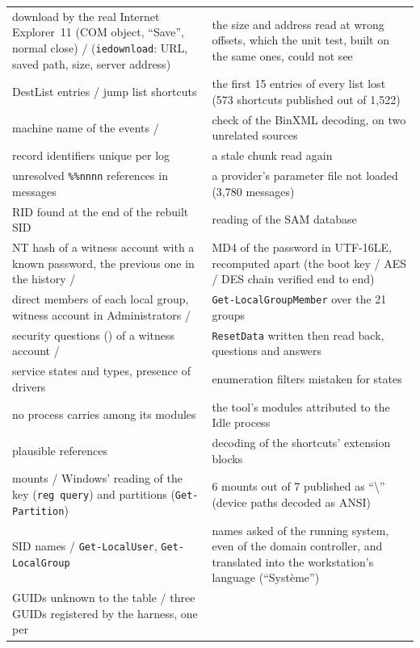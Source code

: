 \documentclass[11pt,a4paper,oneside]{report}
\begin{document}
\begin{longtable}{@{}L{6.6cm}L{8.4cm}@{}}
download by the real Internet Explorer~11 (COM object, ``Save'', normal
  close) /  (\texttt{iedownload}: URL, saved
  path, size, server address) &
  the size and address read at wrong offsets, which the unit test, built on
  the same ones, could not see \\
DestList entries / jump list shortcuts & the first 15 entries of every list
  lost (573 shortcuts published out of 1,522) \\
machine name of the events /  & check of the
  BinXML decoding, on two unrelated sources \\
record identifiers unique per log & a stale chunk read again \\
unresolved \texttt{\%\%nnnn} references in messages & a provider's parameter
  file not loaded (3,780 messages) \\
RID found at the end of the rebuilt SID & reading of the SAM database \\
NT hash of a witness account with a known password, the previous one in the
  history /  & MD4 of the password in UTF-16LE, recomputed
  apart (the boot key / AES / DES chain verified end to end) \\
direct members of each local group, witness account in Administrators /
   & \texttt{Get-LocalGroupMember} over the 21 groups \\
security questions () of a witness account /
   & \texttt{ResetData} written then read back, questions and answers \\
service states and types, presence of drivers & enumeration filters mistaken
  for states \\
no process carries  among its modules & the tool's modules
  attributed to the Idle process \\
plausible  references & decoding of the shortcuts' extension
  blocks \\
mounts / Windows' reading of the key (\texttt{reg query}) and partitions
  (\texttt{Get-Partition}) & 6 mounts out of 7 published as ``\textbackslash{}''
  (device paths decoded as ANSI) \\
SID names / \texttt{Get-LocalUser}, \texttt{Get-LocalGroup} & names asked
  of the running system, even of the domain controller, and translated into
  the workstation's language (``Système'') \\
GUIDs unknown to the table / three GUIDs registered by the harness, one per

\end{longtable}
\end{document}
